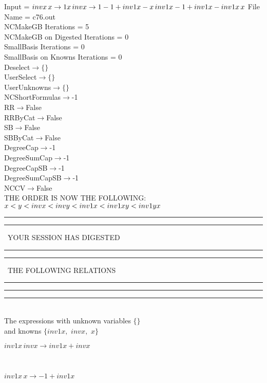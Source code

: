 \documentclass[rep10,leqno]{report}
\begin{document}
\normalsize
\baselineskip=12pt
\noindent
Input = 
$
\\invx\,
 x\rightarrow 1\\
x\,
 invx\rightarrow 1\\
-1 + inv1x - x\,
 inv1x\\
-1 + inv1x - inv1x\,
 x\\
$
File Name = c76.out\\
NCMakeGB Iterations = 5\\
NCMakeGB on Digested Iterations = 0\\
SmallBasis Iterations = 0\\
SmallBasis on Knowns Iterations = 0\\
Deselect$\rightarrow \{\}$\\
UserSelect$\rightarrow \{\}$\\
UserUnknowns$\rightarrow \{\}$\\
NCShortFormulas$\rightarrow$-1\\
RR$\rightarrow $False\\
RRByCat$\rightarrow $False\\
SB$\rightarrow $False\\
SBByCat$\rightarrow $False\\
DegreeCap$\rightarrow $-1\\
DegreeSumCap$\rightarrow $-1\\
DegreeCapSB$\rightarrow $-1\\
DegreeSumCapSB$\rightarrow $-1\\
NCCV$\rightarrow $False\\
THE ORDER IS NOW THE FOLLOWING:\hfil\break
$
x<y<invx<invy<inv1x<inv1xy<inv1yx\\
$
\rule[2pt]{6in}{4pt}\hfil\break
\rule[2pt]{1.879in}{4pt}
\ YOUR SESSION HAS DIGESTED\ 
\rule[2pt]{1.879in}{4pt}\hfil\break
\rule[2pt]{1.923in}{4pt}
\ THE FOLLOWING RELATIONS\ 
\rule[2pt]{1.923in}{4pt}\hfil\break
\rule[2pt]{6in}{4pt}\hfil\break
\rule[3pt]{6in}{.7pt}\\
The expressions with unknown variables $\{\}$\\
and knowns $\{inv1x,
$ $
invx,
$ $
x\}$\smallskip\\
\begin{minipage}{6in}
$
inv1x\,
 invx\rightarrow inv1x + invx
$
\end{minipage}\medskip \\
\begin{minipage}{6in}
$
inv1x\,
 x\rightarrow -1 + inv1x
$
\end{minipage}\medskip \\
\end{document}
